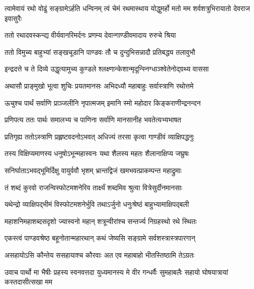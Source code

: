 \threelineshloka
{त्वामेवायं रथो वोढुं सङ्ग्रामेऽर्हति धन्विनम्}
{त्वं चेमं रथमास्थाय योद्धुमर्हो मतो मम}
{शर्वशत्रुभिरायातो देवराज इवासुरैः}



\twolineshloka
{ततो रथादवस्कन्द्य वीर्यवानरिमर्दनः}
{प्रणम्य देवान्गाण्डीवमादाय रुरुचे श्रिया}


\twolineshloka
{ततो विमुच्य बाहुभ्यां सङ्खचूडानि पाण्डवः}
{तौ च दुन्दुभिसन्नादौ प्रतिबद्ध्य तलावुभौ}


\twolineshloka
{इन्द्रदत्ते च ते दिव्ये उद्धृत्यामुच्य कुण्डले}
{श्लक्ष्णान्केशान्मृदून्स्निग्धाञ्श्वेतेनोद्ग्रथ्य वाससा}


\twolineshloka
{अथासौ प्राङ्मुखो भूत्वा शुचिः प्रयतमानसः}
{अभिदध्यौ महाबाहुः सर्वास्त्राणि रथोत्तमे}


\twolineshloka
{ऊचुश्च पार्थं सर्वाणि प्राञ्जलीनि नृपात्मजम्}
{इमानि स्मो महोदार किङ्कराणीन्द्रनन्दन}


\twolineshloka
{प्रणिपत्य ततः पार्थः समालभ्य च पाणिना}
{सर्वाणि मानसानीह भवतेत्यभ्यभाषत}


\twolineshloka
{प्रतिगृह्य ततोऽस्त्राणि प्रह्लष्टवदनोऽभवत्}
{अधिज्यं तरसा कृत्वा गाण्डीवं व्याक्षिपद्धनुः}


\twolineshloka
{तस्य विक्षिप्यमाणस्य धनुषोऽभून्महास्वनः}
{यथा शैलस्य महतः शैलानाक्षिप्य जघ्रुषः}


\twolineshloka
{सनिर्घाताऽभवद्भूमिर्दिक्षु वायुर्ववौ भृशम्}
{भ्रान्तद्विजं खमभवत्प्राकम्पन्त महाद्रुमाः}


\twolineshloka
{तं शब्दं कुरवो राजन्विस्फोटमशनेरिव}
{तार्क्ष्यं शब्दमिव श्रुत्वा वित्रेसुर्दीनमानसाः}


\twolineshloka
{यथेन्द्रो व्याक्षिपद्भीमं विस्फोटमशनेर्भुवि}
{तथाऽर्जुनो धनुःश्रेष्ठं बाहुभ्यामाक्षिपद्बली}


\twolineshloka
{महाशनिमहाशब्दसदृशो ज्यास्वनो महान्}
{शत्रून्वीरांश्च सन्तर्ज्य निग्रहस्थो रथे स्थितः}




\twolineshloka
{एकस्त्वं पाण्डवश्रेष्ठ बहूनोतान्महारथान्}
{कथं जेष्यसि सङ्ग्रामे सर्वशस्त्रास्त्रपारगान्}


\twolineshloka
{असहायोऽसि कौन्तेय ससहायाश्च कौरवाः}
{अत एव महाबाहो भीतस्तिष्ठामि तेऽग्रतः}



\onelineshloka
{उवाच पार्थो मा भैषीः प्रहस्य स्वनवत्तदा}
\twolineshloka
{युध्यमानस्य मे वीर गन्धर्वैः सुमहाबलैः}
{सहायो घोषयात्रायां कस्तदासीत्सखा मम}



